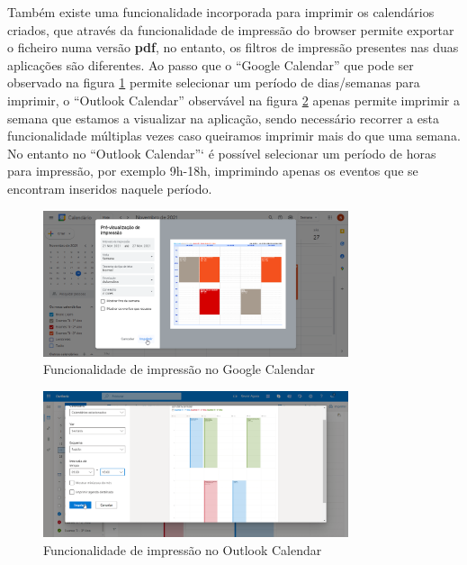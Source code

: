 \documentclass[11pt, twoside]{report}
\begin{document}
Também existe uma funcionalidade incorporada para imprimir os calendários criados, que através da funcionalidade de impressão do browser permite exportar o ficheiro numa versão \textbf{pdf}, no entanto, os filtros de impressão presentes nas duas aplicações são diferentes.
Ao passo que o ``Google Calendar'' que pode ser observado na figura \ref{googleexportar} permite selecionar um período de dias/semanas para imprimir, o ``Outlook Calendar'' observável na figura \ref{outlookexportar} apenas permite imprimir a semana que estamos a visualizar na aplicação, sendo necessário recorrer a esta funcionalidade múltiplas vezes caso queiramos imprimir mais do que uma semana.
No entanto no ``Outlook Calendar''` é possível selecionar um período de horas para impressão, por exemplo 9h-18h, imprimindo apenas os eventos que se encontram inseridos naquele período.
	 
	\begin{figure}[H] 
		\centering
		\includegraphics[width=0.8\textwidth,height=0.8\textheight,keepaspectratio]{image/estadodearte/imprimir_google}
		\caption{Funcionalidade de impressão no Google Calendar}
		\label{googleexportar}
	\end{figure}

	\begin{figure}[H] 
		\centering
		\includegraphics[width=0.8\textwidth,height=0.8\textheight,keepaspectratio]{image/estadodearte/imprimir_outlook}
		\caption{Funcionalidade de impressão no Outlook Calendar}
		\label{outlookexportar}
	\end{figure}
	
\end{document}

